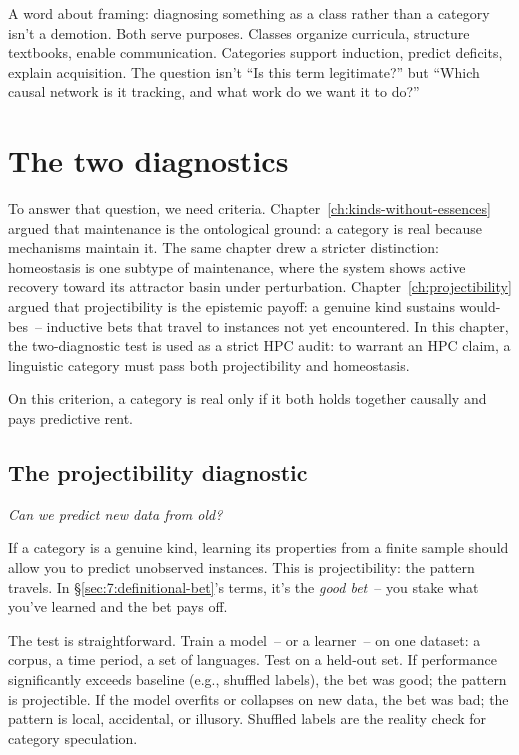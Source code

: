 A word about framing: diagnosing something as a class rather than a category isn't a demotion. Both serve purposes. Classes organize curricula, structure textbooks, enable communication. Categories support induction, predict deficits, explain acquisition. The question isn't \enquote{Is this term legitimate?} but \enquote{Which causal network is it tracking, and what work do we want it to do?}



\section{The two diagnostics}
\label{sec:8:diagnostics}

To answer that question, we need criteria. Chapter~\ref{ch:kinds-without-essences} argued that maintenance is the ontological ground: a category is real because mechanisms maintain it. The same chapter drew a stricter distinction: homeostasis is one subtype of maintenance, where the system shows active recovery toward its attractor basin under perturbation. Chapter~\ref{ch:projectibility} argued that projectibility is the epistemic payoff: a genuine kind sustains would-bes~-- inductive bets that travel to instances not yet encountered. In this chapter, the two-diagnostic test is used as a strict HPC audit: to warrant an HPC claim, a linguistic category must pass both projectibility and homeostasis.

On this criterion, a category is real only if it both holds together causally and pays predictive rent.

\subsection{The projectibility diagnostic}
\label{sec:8:projectibility-diagnostic}

\emph{Can we predict new data from old?}

If a category is a genuine kind, learning its properties from a finite sample should allow you to predict unobserved instances. This is projectibility: the pattern travels. In §\ref{sec:7:definitional-bet}'s terms, it's the \emph{good bet}~-- you stake what you've learned and the bet pays off.

The test is straightforward. Train a model~-- or a learner~-- on one dataset: a corpus, a time period, a set of languages. Test on a held-out set. If performance significantly exceeds baseline (e.g., shuffled labels), the bet was good; the pattern is projectible. If the model overfits or collapses on new data, the bet was bad; the pattern is local, accidental, or illusory. Shuffled labels are the reality check for category speculation.

